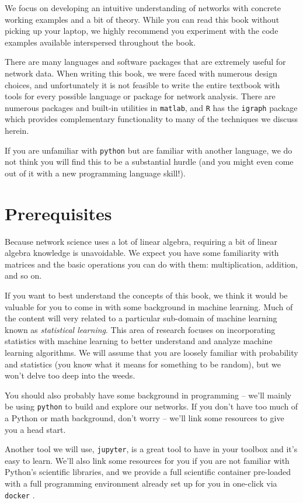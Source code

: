 We focus on developing an intuitive understanding of networks with concrete working examples and a bit of theory. While you can read this book without picking up your laptop, we highly recommend you experiment with the code examples available interspersed throughout the book.

There are many languages and software packages that are extremely useful for network data. When writing this book, we were faced with numerous design choices, and unfortunately it is not feasible to write the entire textbook with tools for every possible language or package for network analysis. There are numerous packages and built-in utilities in \texttt{matlab}, and \texttt{R} has the \texttt{igraph} \cite{csardi2006} package which provides complementary functionality to many of the techniques we discuss herein.

If you are unfamiliar with \texttt{python} but are familiar with another language, we do not think you will find this to be a substantial hurdle (and you might even come out of it with a new programming language skill!). 

\section*{Prerequisites}

Because network science uses a lot of linear algebra, requiring a bit of linear algebra knowledge is unavoidable. We expect you have some familiarity with matrices and the basic operations you can do with them: multiplication, addition, and so on.

If you want to best understand the concepts of this book, we think it would be valuable for you to come in with some background in machine learning. Much of the content will very related to a particular sub-domain of machine learning known as \textit{statistical learning}. This area of research focuses on incorporating statistics with machine learning to better understand and analyze machine learning algorithms. We will assume that you are loosely familiar with probability and statistics (you know what it means for something to be random), but we won't delve too deep into the weeds.

You should also probably have some background in programming -- we'll mainly be using \texttt{python} to build and explore our networks. If you don't have too much of a Python or math background, don't worry -- we'll link some resources to give you a head start.

Another tool we will use, \texttt{jupyter}, is a great tool to have in your toolbox and it's easy to learn. We'll also link some resources for you if you are not familiar with Python's scientific libraries, and we provide a full scientific container pre-loaded with a full programming environment already set up for you in one-click via \texttt{docker} \cite{docker}. 

